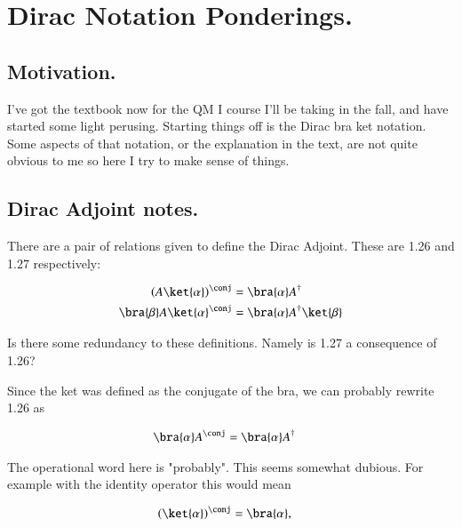 %

\chapter{Dirac Notation Ponderings.}
\label{chap:desaiDiracNotes}
{}
\date{July 23, 2010}

\beginArtNoToc

\section{Motivation.}

I've got the textbook \citep{desai2009quantum} now for the QM I course I'll be taking in the fall, and have started some light perusing.  Starting things off is the Dirac bra ket notation.  Some aspects of that notation, or the explanation in the text, are not quite obvious to me so here I try to make sense of things.

\section{Dirac Adjoint notes.}

There are a pair of relations given to define the Dirac Adjoint.  These are 1.26 and 1.27 respectively:

\begin{align*}
\left( A \ket{\alpha} \right)^\conj &= \bra{\alpha} A^\dagger \\
{\bra{\beta} A \ket{\alpha}}^\conj &= \bra{\alpha} A^\dagger \ket{\beta}
\end{align*}

Is there some redundancy to these definitions.  Namely is 1.27 a consequence of 1.26?

Since the ket was defined as the conjugate of the bra, we can probably rewrite 1.26 as

\begin{align*}
\bra{\alpha} A^\conj &= \bra{\alpha} A^\dagger 
\end{align*}

The operational word here is "probably".  This seems somewhat dubious.  For example with the identity operator this would mean

\begin{align*}
\left( \ket{\alpha} \right)^\conj &= \bra{\alpha},
\end{align*}

